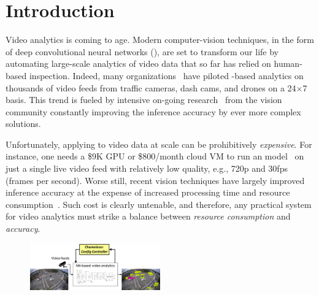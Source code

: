 
\section{Introduction}


Video analytics is coming to age.
Modern computer-vision techniques, in the form of deep convolutional 
neural networks (\nn), are set to transform our life by automating 
large-scale analytics of video data that so far has relied on 
human-based inspection.
Indeed, many organizations~\cite{??,??} have piloted \nn-based 
analytics on thousands of video feeds from traffic cameras, dash 
cams, and drones on a 24$\times$7 basis.
This trend is fueled by intensive on-going research~\cite{??,??}
from the vision community constantly improving the inference accuracy 
by ever more complex \nn solutions.

Unfortunately, applying \nn to video data at scale can be prohibitively
{\em expensive}.
For instance, one needs a \$9K GPU or \$800/month cloud VM to run
an \nn model~\cite{??} on just a single live video feed with relatively 
low quality, e.g., 720p and 30fps (frames per second). 
Worse still, recent vision techniques have largely improved inference
accuracy at the expense of increased processing time and resource 
consumption~\cite{??}.
Such cost is clearly untenable, and therefore, any practical system 
for video analytics must strike a balance between {\em resource 
consumption} and {\em accuracy}.


\begin{figure}[t!]
\centering
\includegraphics[width=0.5\textwidth]{PaperFigures/Overall.pdf}
\vspace{-0.3cm}
\label{fig:overall}
\end{figure}

